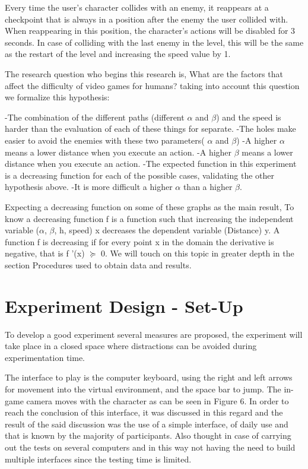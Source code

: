 Every time the user's character collides with an enemy, it reappears at a checkpoint that is always in a position after the enemy the user collided with. When reappearing in this position, the character's actions will be disabled for 3 seconds. In case of colliding with the last enemy in the level, this will be the same as the restart of the level and increasing the speed value by 1.

The research question who begins this research is, What are the factors that affect the difficulty of video games for humans? taking into account this question we formalize this hypothesis:

-The combination of the different paths (different $\alpha$ and $\beta$) and the speed is harder than the evaluation of each of these things for separate.
-The holes make easier to avoid the enemies with these two parameters( $\alpha$ and $\beta$)
-A higher $\alpha$ means a lower distance when you execute an action.
-A higher $\beta$ means a lower distance when you execute an action.
-The expected function in this experiment is a decreasing function for each of the possible cases, validating the other hypothesis above.
-It is more difficult a higher $\alpha$ than a higher $\beta$.

Expecting a decreasing function on some of these graphs as the main result, To know a decreasing function f is a function such that increasing the independent variable ($\alpha$, $\beta$, h, speed) x decreases the dependent variable (Distance) y. A function f is decreasing if for every point x in the domain the derivative is negative, that is f '(x) $\succeq$ 0. We will touch on this topic in greater depth in the section Procedures used to obtain data and results.

\section{Experiment Design - Set-Up}

To develop a good experiment several measures are proposed, the experiment will take place in a closed space where distractions can be avoided during experimentation time.

The interface to play is the computer keyboard, using the right and left arrows for movement into the virtual environment, and the space bar to jump. The in-game camera moves with the character as can be seen in Figure 6.
In order to reach the conclusion of this interface, it was discussed in this regard and the result of the said discussion was the use of a simple interface, of daily use and that is known by the majority of participants. Also thought in case of carrying out the tests on several computers and in this way not having the need to build multiple interfaces since the testing time is limited.

